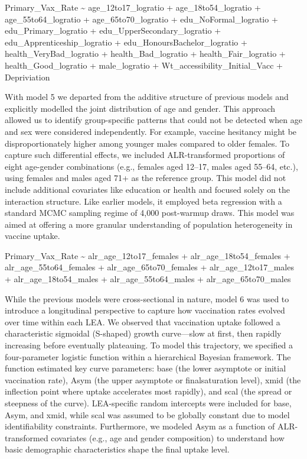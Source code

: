 \documentclass{article}
\begin{document}
Primary\_Vax\_Rate \textasciitilde{} age\_12to17\_logratio +
age\_18to54\_logratio + age\_55to64\_logratio + age\_65to70\_logratio +
edu\_NoFormal\_logratio + edu\_Primary\_logratio +
edu\_UpperSecondary\_logratio + edu\_Apprenticeship\_logratio +
edu\_HonoursBachelor\_logratio + health\_VeryBad\_logratio +
health\_Bad\_logratio + health\_Fair\_logratio + health\_Good\_logratio
+ male\_logratio + Wt\_accessibility\_Initial\_Vacc + Depriviation

With model 5 we departed from the additive structure of previous models
and explicitly modelled the joint distribution of age and gender. This
approach allowed us to identify group-specific patterns that could not
be detected when age and sex were considered independently. For example,
vaccine hesitancy might be disproportionately higher among younger males
compared to older females. To capture such differential effects, we
included ALR-transformed proportions of eight age-gender combinations
(e.g., females aged 12--17, males aged 55--64, etc.), using females and
males aged 71+ as the reference group. This model did not include
additional covariates like education or health and focused solely on the
interaction structure. Like earlier models, it employed beta regression
with a standard MCMC sampling regime of 4,000 post-warmup draws. This
model was aimed at offering a more granular understanding of population
heterogeneity in vaccine uptake.

Primary\_Vax\_Rate \textasciitilde{} alr\_age\_12to17\_females +
alr\_age\_18to54\_females + alr\_age\_55to64\_females +
alr\_age\_65to70\_females + alr\_age\_12to17\_males +
alr\_age\_18to54\_males + alr\_age\_55to64\_males +
alr\_age\_65to70\_males

While the previous models were cross-sectional in nature, model 6 was
used to introduce a longitudinal perspective to capture how vaccination
rates evolved over time within each LEA. We observed that vaccination
uptake followed a characteristic sigmoidal (S-shaped) growth
curve---slow at first, then rapidly increasing before eventually
plateauing. To model this trajectory, we specified a four-parameter
logistic function within a hierarchical Bayesian framework. The function
estimated key curve parameters: base (the lower asymptote or initial
vaccination rate), Asym (the upper asymptote or finalsaturation level),
xmid (the inflection point where uptake accelerates most rapidly), and
scal (the spread or steepness of the curve). LEA-specific random
intercepts were included for base, Asym, and xmid, while scal was
assumed to be globally constant due to model identifiability
constraints. Furthermore, we modeled Asym as a function of
ALR-transformed covariates (e.g., age and gender composition) to
understand how basic demographic characteristics shape the final uptake
level.
\end{document}
